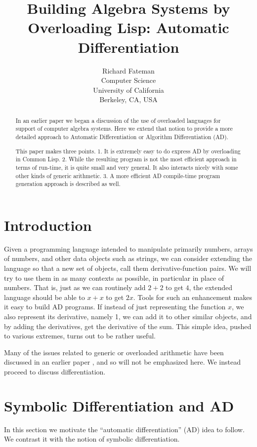 \documentclass{article}
\title {Building Algebra Systems by Overloading Lisp: Automatic Differentiation}
\author {Richard Fateman\\
Computer Science\\
University of California\\
Berkeley, CA, USA}
\begin{document}
\maketitle
\begin{abstract}
In an earlier paper \cite{basol} we began a discussion of the use of
overloaded languages for support of computer algebra systems.  Here we
extend that notion to provide a more detailed approach to Automatic
Differentiation or Algorithm Differentiation (AD).

This paper makes three points. 1. It is extremely easy to do express
AD by overloading in Common Lisp.  2. While the resulting program is
not the most efficient approach in terms of run-time, it is quite
small and very general. It also interacts nicely with some other kinds
of generic arithmetic.  3. A more efficient AD compile-time program
generation approach is described as well.
\end{abstract} 

\section{Introduction}

Given a programming language intended to manipulate primarily numbers,
arrays of numbers, and other data objects such as strings, we can
consider extending the language so that a new set of objects,
call them derivative-function pairs.  We will try to use them in
as many contexts as possible, in particular in place of numbers. That is, just
as we can routinely add $2+2$ to get $4$, the extended language should
be able to $x+x$ to get $2 x$.  Tools for such an enhancement makes it
easy to build AD programs. If instead of just representing the function
$x$, we also represent its derivative, namely 1,  we can add it to other
similar objects, and by adding the derivatives, get the derivative of
the sum. This simple idea, pushed to various
extremes, turns out to be rather useful.

Many of the issues related to generic or overloaded arithmetic
have been discussed in an earlier paper \cite{basol}, and so
will not be emphasized here. We instead proceed to discuss
differentiation.


\section{Symbolic Differentiation and AD}

In this section we motivate the ``automatic differentiation'' (AD)
idea to follow. We contrast it with the notion of symbolic differentiation.
\end{document}

